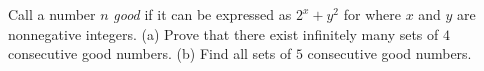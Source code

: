 Call a number $n$ \textit{good} if it can be expressed as $2^x+y^2$ for where $x$ and $y$ are nonnegative integers.
(a) Prove that there exist infinitely many sets of $4$ consecutive good numbers.
(b) Find all sets of $5$ consecutive good numbers.

